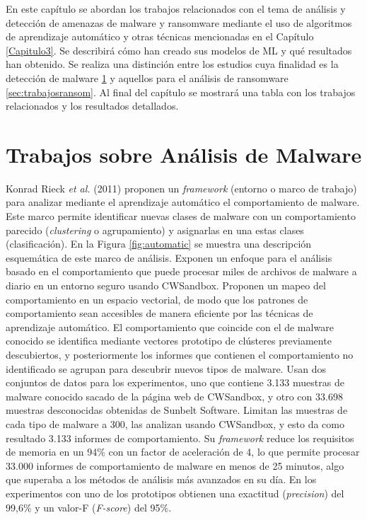 \noindent En este capítulo se abordan los trabajos relacionados con el tema de análisis y detección de amenazas de malware y ransomware mediante el uso de algoritmos de aprendizaje automático y otras técnicas mencionadas en el Capítulo \ref{Capitulo3}. Se describirá cómo han creado sus modelos de \gls{ML} y qué resultados han obtenido. Se realiza una distinción entre los estudios cuya finalidad es la detección de malware \ref{sec:trabajosmalware} y aquellos para el análisis de ransomware \ref{sec:trabajosransom}. Al final del capítulo se mostrará una tabla con los trabajos relacionados y los resultados detallados.

\section{Trabajos sobre Análisis de Malware} 
\label{sec:trabajosmalware}

\noindent Konrad Rieck \textit{et al.} (2011) \cite{automatic} proponen un \textit{framework} (entorno o marco de trabajo) para analizar mediante el aprendizaje automático el comportamiento de malware. Este marco permite identificar nuevas clases de malware con un comportamiento parecido (\textit{clustering} o agrupamiento) y asignarlas en una estas clases (clasificación). En la Figura \ref{fig:automatic} se muestra una descripción esquemática de este marco de análisis. Exponen un enfoque para el análisis basado en el comportamiento que puede procesar miles de archivos de malware a diario en un entorno seguro usando CWSandbox. Proponen un mapeo del comportamiento en un espacio vectorial, de modo que los patrones de comportamiento sean accesibles de manera eficiente por las técnicas de aprendizaje automático. El comportamiento que coincide con el de malware conocido se identifica mediante vectores prototipo de clústeres previamente descubiertos, y posteriormente los informes que contienen el comportamiento no identificado se agrupan para descubrir nuevos tipos de malware. Usan dos conjuntos de datos para los experimentos, uno que contiene 3.133 muestras de malware conocido sacado de la página web de CWSandbox, y otro con 33.698 muestras desconocidas obtenidas de Sunbelt Software. Limitan las muestras de cada tipo de malware a 300, las analizan usando CWSandbox, y esto da como resultado 3.133 informes de comportamiento. Su \textit{framework} reduce los requisitos de memoria en un 94\% con un factor de aceleración de 4, lo que permite procesar 33.000 informes de comportamiento de malware en menos de 25 minutos, algo que superaba a los métodos de análisis más avanzados en su día. En los experimentos con uno de los prototipos obtienen una exactitud (\textit{precision}) del 99,6\% y un valor-F (\textit{F-score}) del 95\%.

